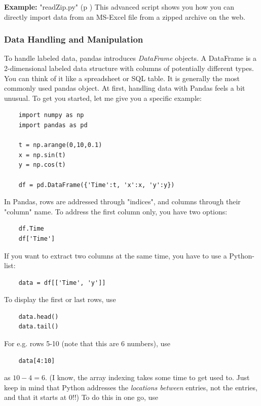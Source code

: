 \textbf{Example: }
\PyImg "readZip.py" (p \pageref{py:readZip}) This advanced script shows you how you can directly import data from an MS-Excel file from a zipped archive on the web.

\subsubsection{Data Handling and Manipulation}


To handle labeled data, pandas introduces \emph{DataFrame} objects. A DataFrame is a 2-dimensional labeled data structure with columns of potentially different types. You can think of it like a spreadsheet or SQL table. It is generally the most commonly used pandas object.
At first, handling data with Pandas feels a bit unusual. To get you started, let me give you a specific example:

\begin{lstlisting}
    import numpy as np
    import pandas as pd

    t = np.arange(0,10,0.1)
    x = np.sin(t)
    y = np.cos(t)

    df = pd.DataFrame({'Time':t, 'x':x, 'y':y})
\end{lstlisting}

In Pandas, rows are addressed through "indices", and columns through their "column" name.
To address the first column only, you have two options:

\begin{lstlisting}
    df.Time
    df['Time']
\end{lstlisting}

If you want to extract two columns at the same time, you have to use a Python-list:

\begin{lstlisting}
    data = df[['Time', 'y']]
\end{lstlisting}

To display the first or last rows, use

\begin{lstlisting}
    data.head()
    data.tail()
\end{lstlisting}

For e.g. rows 5-10 (note that this are 6 numbers), use

\begin{lstlisting}
    data[4:10]
\end{lstlisting}

as $10-4=6$. (I know, the array indexing takes some time to get used to. Just keep in mind that Python addresses the \emph{locations between} entries, not the entries, and that it starts at $0$!!) To do this in one go, use

